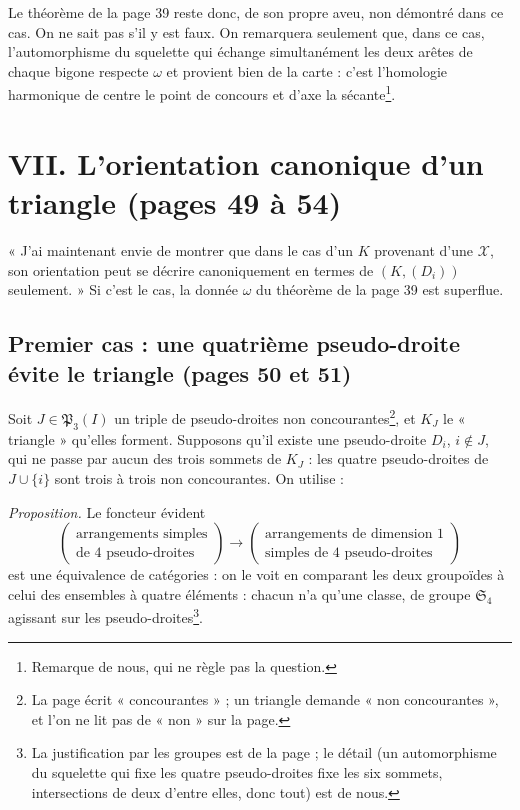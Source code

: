 \documentclass[11pt,a4paper]{article}
\begin{document}
Le théorème de la page 39 reste donc, de son propre aveu, non démontré dans
ce cas. On ne sait pas s'il y est faux. On remarquera seulement que, dans ce
cas, l'automorphisme du squelette qui échange simultanément les deux arêtes
de chaque bigone respecte $\omega$ et provient bien de la carte : c'est
l'homologie harmonique de centre le point de concours et d'axe la sécante\footnote{Remarque de nous, qui ne règle pas la question.}.

\section*{VII. L'orientation canonique d'un triangle (pages 49 à 54)}

« J'ai maintenant envie de montrer que dans le cas d'un $K$ provenant d'une
$\mathcal{X}$, son orientation peut se décrire canoniquement en termes de
$(K, (D_i))$ seulement. » Si c'est le cas, la donnée $\omega$ du théorème de
la page 39 est superflue.

\subsection*{Premier cas : une quatrième pseudo-droite évite le triangle (pages 50 et 51)}

Soit $J \in \mathfrak{P}_3(I)$ un triple de pseudo-droites non
concourantes\footnote{La page écrit « concourantes » ; un triangle demande
« non concourantes », et l'on ne lit pas de « non » sur la page.}, et $K_J$
le « triangle » qu'elles forment. Supposons qu'il existe une pseudo-droite
$D_i$, $i \notin J$, qui ne passe par aucun des trois sommets de $K_J$ : les
quatre pseudo-droites de $J \cup \{i\}$ sont trois à trois non concourantes.
On utilise :

\emph{Proposition.} Le foncteur évident
\[
\begin{pmatrix} \text{arrangements simples} \\ \text{de } 4
\text{ pseudo-droites} \end{pmatrix} \longrightarrow
\begin{pmatrix} \text{arrangements de dimension } 1 \\ \text{simples de } 4
\text{ pseudo-droites} \end{pmatrix}
\]
est une équivalence de catégories : on le voit en comparant les deux
groupoïdes à celui des ensembles à quatre éléments : chacun n'a qu'une
classe, de groupe $\mathfrak{S}_4$ agissant sur les pseudo-droites\footnote{La
justification par les groupes est de la page ; le détail (un
automorphisme du squelette qui fixe les quatre pseudo-droites fixe les six
sommets, intersections de deux d'entre elles, donc tout) est de nous.}.
\end{document}
